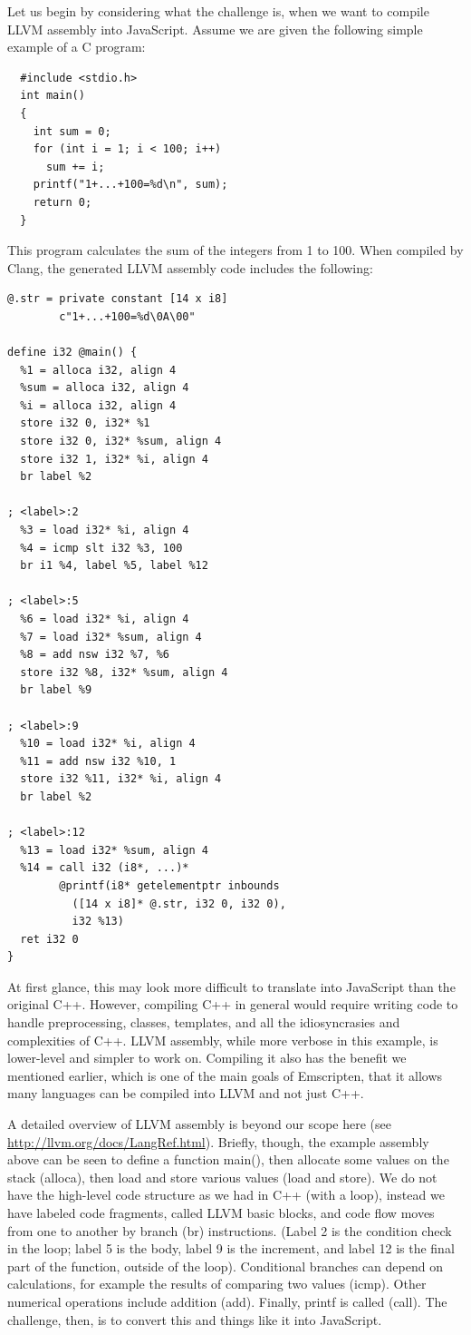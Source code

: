 \documentclass[preprint,10pt]{sigplanconf}
\begin{document}
Let us begin by considering what the challenge is, when we want to compile LLVM assembly
into JavaScript. Assume we are given the
following simple example of a C program:
\begin{verbatim}
  #include <stdio.h>
  int main()
  {
    int sum = 0;
    for (int i = 1; i < 100; i++)
      sum += i;
    printf("1+...+100=%d\n", sum);
    return 0;
  }
\end{verbatim}
This program calculates the sum of the integers from 1 to 100. When
compiled by Clang, the generated LLVM
assembly code includes the following:
\label{code:examplellvm}
\begin{verbatim}
@.str = private constant [14 x i8]
        c"1+...+100=%d\0A\00"

define i32 @main() {
  %1 = alloca i32, align 4
  %sum = alloca i32, align 4
  %i = alloca i32, align 4
  store i32 0, i32* %1
  store i32 0, i32* %sum, align 4
  store i32 1, i32* %i, align 4
  br label %2

; <label>:2
  %3 = load i32* %i, align 4
  %4 = icmp slt i32 %3, 100
  br i1 %4, label %5, label %12

; <label>:5
  %6 = load i32* %i, align 4
  %7 = load i32* %sum, align 4
  %8 = add nsw i32 %7, %6
  store i32 %8, i32* %sum, align 4
  br label %9

; <label>:9
  %10 = load i32* %i, align 4
  %11 = add nsw i32 %10, 1
  store i32 %11, i32* %i, align 4
  br label %2

; <label>:12
  %13 = load i32* %sum, align 4
  %14 = call i32 (i8*, ...)*
        @printf(i8* getelementptr inbounds
          ([14 x i8]* @.str, i32 0, i32 0),
          i32 %13)
  ret i32 0
}
\end{verbatim}
At first glance, this may look more difficult to translate into
JavaScript than the original C++. However, compiling C++ in
general would require writing code to handle preprocessing,
classes, templates, and all the idiosyncrasies and complexities
of C++. LLVM assembly, while more verbose in this example, is
lower-level and simpler to work on. Compiling it also has the benefit we
mentioned earlier, which
is one of the main goals of Emscripten, that it allows many languages can
be compiled into LLVM and not just C++.

A detailed overview of LLVM assembly is beyond our scope here (see \url{http://llvm.org/docs/LangRef.html}). Briefly,
though, the example assembly above can be seen to define a
function main(), then allocate some values on the stack (alloca),
then load and store various values (load and store). We do not have
the high-level code structure as we had in C++ (with a loop), instead
we have labeled code fragments, called LLVM basic blocks, and code flow moves
from one to another by branch (br) instructions. (Label 2 is the
condition check in the loop; label 5 is the body, label 9 is the
increment, and label 12 is the final part of the function, outside
of the loop).
Conditional branches
can depend on calculations, for example the results of comparing
two values (icmp). Other numerical operations include addition (add).
Finally, printf is called (call). The challenge, then, is to convert
this and things like it into JavaScript.
\end{document}
